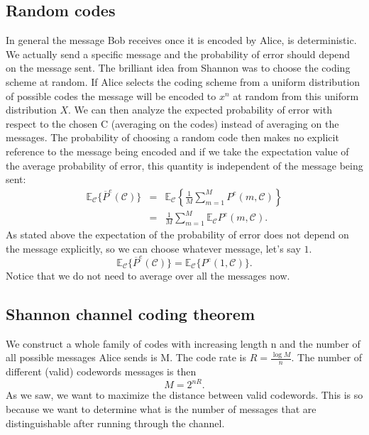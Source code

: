 \subsection{Random codes}
In general the message Bob receives once it is encoded by Alice, is deterministic. We actually send a specific message and the probability of error should depend on the message sent. The brilliant idea from Shannon was to choose the coding scheme at random. If Alice selects the coding scheme from a uniform distribution of possible codes the message will be encoded to $x^n$ at random from this uniform distribution $X$. We can then analyze the expected probability of error with respect to the chosen C (averaging on the codes) instead of averaging on the messages. The probability of choosing a random code then makes no explicit reference to the message being encoded and if we take the expectation value of the average probability of error, this quantity is independent of the message being sent:
\begin{eqnarray}
\mathbb{E}_{\mathcal{C}}\{\overline{P}^e(\mathcal{C})\} &=& \mathbb{E}_{\mathcal{C}}\left\{\frac{1}{M}\sum_{m=1}^{M}P^e(m,\mathcal{C})\right\} \\
 &=& \frac{1}{M}\sum_{m=1}^{M}\mathbb{E}_{\mathcal{C}}P^e(m,\mathcal{C}).
\end{eqnarray}
As stated above the expectation of the probability of error does not depend on the message explicitly, so we can choose whatever message, let's say $1$. 
\begin{equation}
\mathbb{E}_{\mathcal{C}}\{\overline{P}^e(\mathcal{C})\} = \mathbb{E}_{\mathcal{C}}\{P^e(1,\mathcal{C})\}.
\end{equation}
Notice that we do not need to average over all the messages now.


\subsection{Shannon channel coding theorem}
We construct a whole family of codes with increasing length n and the number of all possible messages Alice sends is M. The code rate is $R = \frac{\log M}{n}$. The number of different (valid) codewords messages is then $$M = 2^{nR}.$$  As we saw, we want to maximize the distance between valid codewords. This is so because we want to determine what is the number of messages that are distinguishable after running through the channel. 

